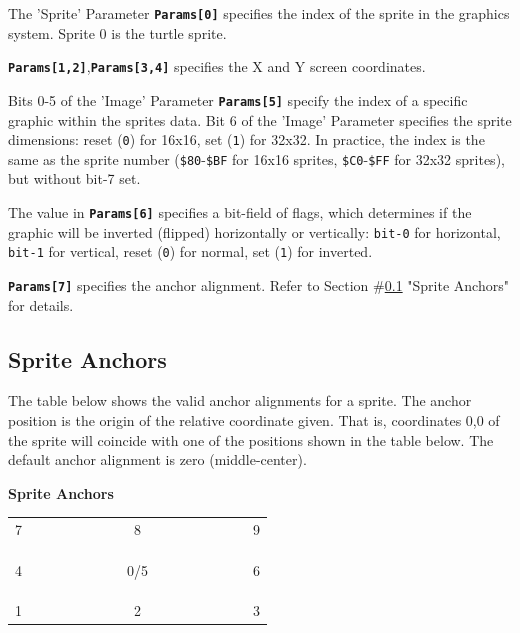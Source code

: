 \documentclass[12pt]{article}
\newcommand{\MonoSp}[1] {\fontsize{10pt}{10pt}\selectfont\texttt{#1}\normalsize}
\newcommand{\Param}[1] {\textbf{\texttt{Params[#1]}}}
\begin{document}
The 'Sprite' Parameter \Param{0} specifies the index of the sprite in the graphics system.
Sprite 0 is the turtle sprite.
\newline

\Param{1,2},\Param{3,4} specifies the X and Y screen coordinates.
\newline

Bits 0-5 of the 'Image' Parameter \Param{5} specify
the index of a specific graphic within the sprites data.
Bit 6 of the 'Image' Parameter specifies the sprite dimensions:
reset (\MonoSp{0}) for 16x16, set (\MonoSp{1}) for 32x32.
In practice, the index is the same as the sprite number
(\MonoSp{\$80}-\MonoSp{\$BF} for 16x16 sprites,
\MonoSp{\$C0}-\MonoSp{\$FF} for 32x32 sprites), but without bit-7 set.
\newline

The value in \Param{6} specifies a bit-field of flags,
which determines if the graphic will be inverted (flipped) horizontally or vertically:
\MonoSp{bit-0} for horizontal, \MonoSp{bit-1} for vertical,
reset (\MonoSp{0}) for normal, set (\MonoSp{1}) for inverted.
\newline

\Param{7} specifies the anchor alignment.
Refer to Section \#\ref{subsec:sprite-anchors} "Sprite Anchors" for details.
\newline


\pagebreak


\subsection{Sprite Anchors}\label{subsec:sprite-anchors}

The table below shows the valid anchor alignments for a sprite.
The anchor position is the origin of the relative coordinate given.
That is, coordinates 0,0 of the sprite
will coincide with one of the positions shown in the table below.
The default anchor alignment is zero (middle-center).

\begin{table}[h]
\centering\textbf{Sprite Anchors} \\
\begin{tabular}{| l | c | r | }      \hline
7~~~~~~~~~&~~~~~8~~~~~&~~~~~~~~~9 \\
          &           &           \\
          &           &           \\ \hline
          &           &           \\
4         &    0/5    &         6 \\
          &           &           \\ \hline
          &           &           \\
          &           &           \\
1         &     2     &         3 \\
\hline
\end{tabular}
\end{table}
\end{document}
